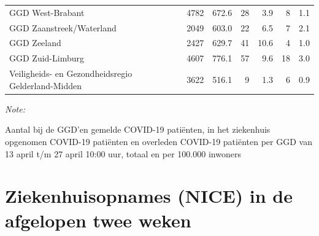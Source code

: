 \documentclass[
  english,
  man,floatsintext]{apa6}
\begin{document}
\begin{table}
\begin{threeparttable}
\begin{tabular}{lrrrrrr}
GGD West-Brabant & 4782 & 672.6 & 28 & 3.9 & 8 & 1.1\\
GGD Zaanstreek/Waterland & 2049 & 603.0 & 22 & 6.5 & 7 & 2.1\\
GGD Zeeland & 2427 & 629.7 & 41 & 10.6 & 4 & 1.0\\
GGD Zuid-Limburg & 4607 & 776.1 & 57 & 9.6 & 18 & 3.0\\
Veiligheids- en Gezondheidsregio Gelderland-Midden & 3622 & 516.1 & 9 & 1.3 & 6 & 0.9\\
\bottomrule
\end{tabular}
\begin{tablenotes}
\item \textit{Note: } 
\item Aantal bij de GGD’en gemelde COVID-19 patiënten, in het ziekenhuis opgenomen COVID-19 patiënten en overleden COVID-19 patiënten per GGD van 13 april t/m 27 april 10:00 uur, totaal en per 100.000 inwoners
\end{tablenotes}
\end{threeparttable}
\endgroup{}
\end{table}

\newpage

\hypertarget{ziekenhuisopnames-nice-in-de-afgelopen-twee-weken}{%
\section{Ziekenhuisopnames (NICE) in de afgelopen twee weken}\label{ziekenhuisopnames-nice-in-de-afgelopen-twee-weken}}
\end{document}
